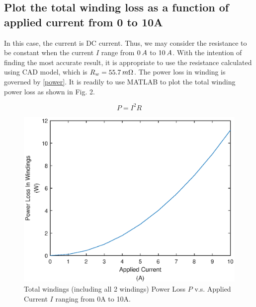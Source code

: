 \documentclass[a4paper]{IEEEtran}
\begin{document}
\subsection{Plot the total winding loss as a function of applied current from 0 to 10A}
In this case, the current is DC current. Thus, we may consider the resistance to be constant when the current $I$ range from
$0\hskip 0.2emA$ to $10\hskip 0.2emA$. With the intention of finding the most accurate result, it is appropriate to use the resistance calculated using CAD model, which is $R_w=55.7\hskip 0.2emm\Omega$.
The power loss in winding is governed by \eqref{power}. It is readily to use MATLAB to plot the total winding power loss as shown in Fig. 2.

\begin{equation}
  P=I^2R\label{power}
\end{equation}

\begin{figure}[H]
\begin{centering}
\includegraphics[scale=0.55]{P-I.eps}
\par\end{centering}   
\caption{Total windings (including all 2 windings) Power Loss $P$ v.s. Applied Current $I$ ranging from 0A to 10A.\label{power loss in winding vs. applied current}}
\end{figure}   

\end{document}
